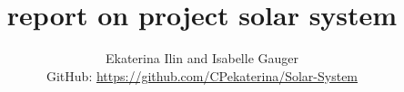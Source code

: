 \documentclass[11pt,a4wide]{article}
\begin{document}
\title{report on project solar system}
\author{Ekaterina Ilin and Isabelle Gauger\\GitHub: \url{https://github.com/CPekaterina/Solar-System}
}
\maketitle
\tableofcontents
\newpage
\end{document}
